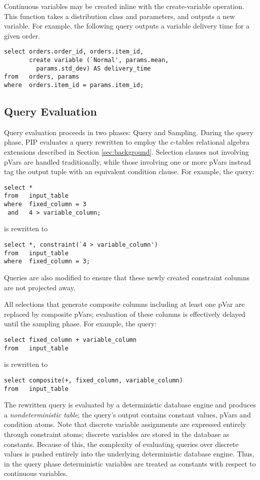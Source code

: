 Continuous variables may be created inline with the create-variable operation.  This function takes a distribution class and parameters, and outputs a new variable.  For example, the following query outputs a variable delivery time for a given order.

\begin{verbatim}
select orders.order_id, orders.item_id,
       create variable (`Normal', params.mean,
         params.std_dev) AS delivery_time
from   orders, params
where  orders.item_id = params.item_id;
\end{verbatim}

\subsection{Query Evaluation}
Query evaluation proceeds in two phases: Query and Sampling.  During the query phase, PIP evaluates a query rewritten to employ the c-tables relational algebra extensions described in Section \ref{sec:background}.  Selection clauses not involving pVars are handled traditionally, while those involving one or more pVars instead tag the output tuple with an equivalent condition clause.  For example, the query:

\begin{verbatim}
select *
from   input_table
where  fixed_column = 3
 and   4 > variable_column;
\end{verbatim}
%
is rewritten to
%
\begin{verbatim}
select *, constraint(`4 > variable_column')
from   input_table
where  fixed_column = 3;
\end{verbatim}

Queries are also modified to ensure that these newly created constraint columns are not projected away.

All selections that generate composite columns including at least one pVar are replaced by composite pVars; evaluation of these columns is effectively delayed until the sampling phase.  For example, the query:

\begin{verbatim}
select fixed_column + variable_column
from   input_table
\end{verbatim}
%
is rewritten to
%
\begin{verbatim}
select composite(+, fixed_column, variable_column)
from   input_table
\end{verbatim}

The rewritten query is evaluated by a deterministic database engine and produces a \textit{nondeterministic table}; the query's output contains constant values, pVars and condition atoms.   Note that discrete variable assignments are expressed entirely through constraint atoms; discrete variables are stored in the database as constants.  Because of this, the complexity of evaluating queries over discrete values is pushed entirely into the underlying deterministic database engine.  Thus, in the query phase deterministic variables are treated as constants with respect to continuous variables.

